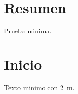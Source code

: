 \documentclass[11pt,a4paper,oneside]{report}
\begin{document}
\frontmatter
\chapter*{Resumen}
Prueba minima.
\mainmatter
\chapter{Inicio}
Texto minimo con \SI{2}{\meter}.
\printbibliography
\end{document}
